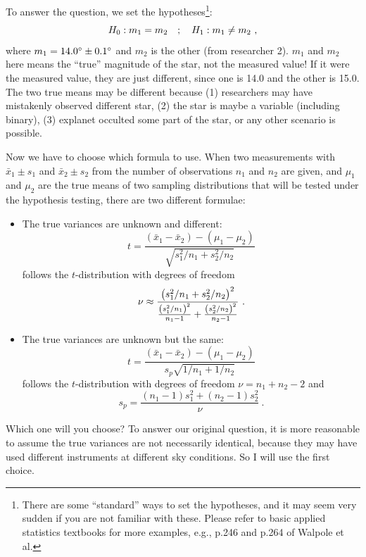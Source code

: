 To answer the question, we set the hypotheses\footnote{There are some ``standard'' ways to set the hypotheses, and it may seem very sudden if you are not familiar with these. Please refer to basic applied statistics textbooks for more examples, e.g., p.246 and p.264 of Walpole et al.}:
\begin{equation}
  H_0 : m_1 = m_2 
  \quad;\quad
  H_1 : m_1 \neq m_2 ~,
\end{equation}
where $ m_1 = \m{14.0} \pm \m{0.1} $ and $ m_2 $ is the other (from researcher 2). $ m_1 $ and $ m_2 $ here means the ``true'' magnitude of the star, not the measured value! If it were the measured value, they are just different, since one is 14.0 and the other is 15.0. The two true means may be different because (1) researchers may have mistakenly observed different star, (2) the star is maybe a variable (including binary), (3) explanet occulted some part of the star, or any other scenario is possible.

Now we have to choose which formula to use. When two measurements with $ \bar{x}_1 \pm s_1 $ and $ \bar{x}_2 \pm s_2 $ from the number of observations $ n_1 $ and $ n_2 $ are given, and $ \mu_1 $ and $ \mu_2 $ are the true means of two sampling distributions that will be tested under the hypothesis testing, there are two different formulae:
\begin{itemize}
\item The true variances are unknown and different:
\begin{equation}
  t = \frac{(\bar{x}_1 - \bar{x}_2) - (\mu_1 - \mu_2) }{\sqrt{s_1^2 / n_1 + s_2^2 / n_2}}
\end{equation}
follows the $ t $-distribution with degrees of freedom
\begin{equation}
  \nu \approx 
    \frac{\qty( s_1^2 / n_1 + s_2^2 / n_2 )^2}
    {\frac{ \qty(s_1^2 / n_1)^2 }{n_1 - 1}
      + \frac{ \qty(s_2^2 / n_2)^2 }{n_2 - 1}} ~.
\end{equation}
\item The true variances are unknown but the same:
\begin{equation}
  t = \frac{(\bar{x}_1 - \bar{x}_2) - (\mu_1 - \mu_2) }{s_p \sqrt{1 / n_1 + 1 / n_2}}
\end{equation}
follows the $ t $-distribution with degrees of freedom $ \nu = n_1 + n_2 - 2 $ and
\begin{equation}
  s_p = \frac{(n_1 - 1) s_1^2 + (n_2 - 1) s_2^2}{\nu} ~.
\end{equation}
\end{itemize}
Which one will you choose? To answer our original question, it is more reasonable to assume the true variances are not necessarily identical, because they may have used different instruments at different sky conditions. So I will use the first choice.

